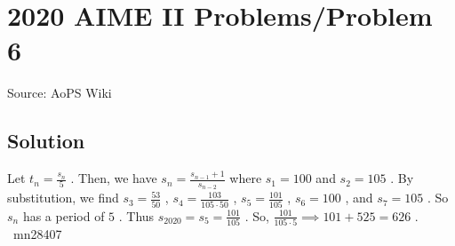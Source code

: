 \documentclass[12pt]{article}
\begin{document}
\section*{{2020 AIME II Problems/Problem 6}}
Source: AoPS Wiki

\subsection*{Solution}
Let $t_n=\frac{s_n}{5}$ . Then, we have $s_n=\frac{s_{n-1}+1}{s_{n-2}}$ where $s_1 = 100$ and $s_2 = 105$ . By substitution, we find $s_3 = \frac{53}{50}$ , $s_4=\frac{103}{105\cdot50}$ , $s_5=\frac{101}{105}$ , $s_6=100$ , and $s_7=105$ . So $s_n$ has a period of $5$ . Thus $s_{2020}=s_5=\frac{101}{105}$ . So, $\frac{101}{105\cdot 5}\implies 101+525=\boxed{626}$ .
~mn28407
\end{document}
